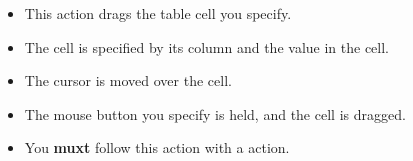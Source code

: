 
\begin{itemize}
\item This action drags the table cell you specify.
\item The cell is specified by its column and the value in the cell. 
\item The cursor is moved over the cell.
\item The mouse button you specify is held, and the cell is dragged. 
\item You \textbf{muxt} follow this action with a  action.
\end{itemize}


